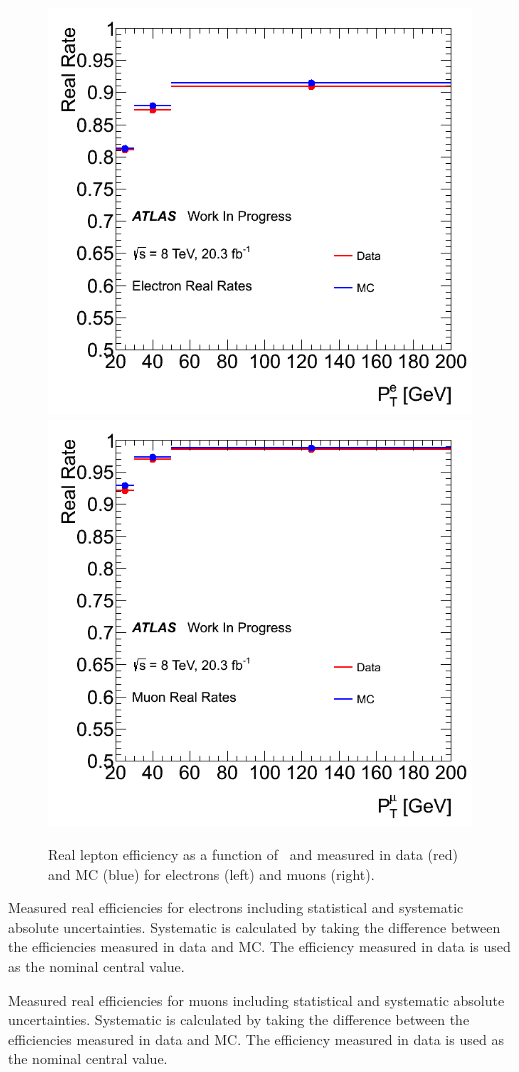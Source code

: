 \begin{figure}[h!]
\centering
\includegraphics[width=0.45\columnwidth]{figures/fakes_bkg/Efficiencies/ElectronRealRates.png}
\includegraphics[width=0.45\columnwidth]{figures/fakes_bkg/Efficiencies/MuonRealRates.png}
\caption{Real lepton efficiency as a function of \pt\ and measured in data (red) and MC (blue) for electrons (left) and muons (right).}
\label{fig:realEff}
\end{figure}

\clearpage

\begin{table}[h!]
\centering

\caption{Measured real efficiencies for electrons including statistical and systematic absolute uncertainties. 
Systematic is calculated by taking the difference
between the efficiencies measured in data and MC.  The efficiency measured in data is used as the nominal central value.
} 
\label{table:realEff_El}
\end{table} 

\begin{table}[h!]
\centering

\caption{Measured real efficiencies for muons including statistical and systematic absolute uncertainties.
Systematic is calculated by taking the difference
between the efficiencies measured in data and MC.  The efficiency measured in data is used as the nominal central value.
} 
\label{table:realEff_Mu}
\end{table} 


